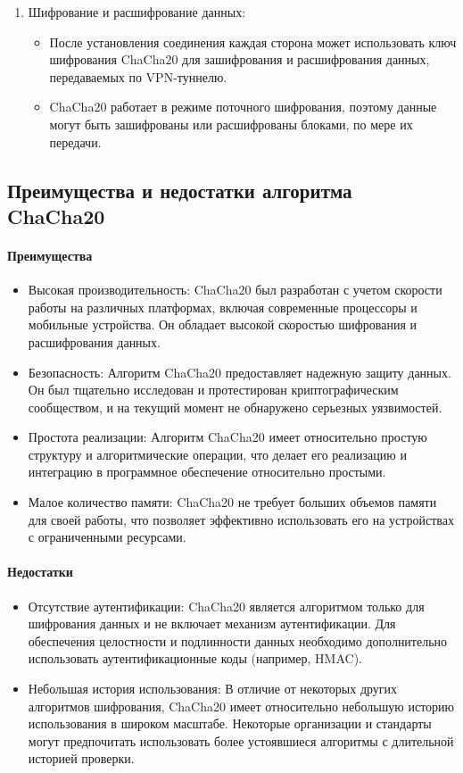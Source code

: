 \documentclass[12pt]{article}
\begin{document}
\begin{enumerate}
        \item Шифрование и расшифрование данных:
        \begin{itemize}
            \item После установления соединения каждая сторона может использовать ключ шифрования ChaCha20 для зашифрования и расшифрования данных, передаваемых по VPN-туннелю.
            \item ChaCha20 работает в режиме поточного шифрования, поэтому данные могут быть зашифрованы или расшифрованы блоками, по мере их передачи.
        \end{itemize}
    \end{enumerate}

    \subsection{Преимущества и недостатки алгоритма ChaCha20}

    \paragraph{Преимущества}
    \begin{itemize}
        \item Высокая производительность: ChaCha20 был разработан с учетом скорости работы на различных платформах, включая современные процессоры и мобильные устройства.
        Он обладает высокой скоростью шифрования и расшифрования данных.
        \item Безопасность: Алгоритм ChaCha20 предоставляет надежную защиту данных.
        Он был тщательно исследован и протестирован криптографическим сообществом, и на текущий момент не обнаружено серьезных уязвимостей.
        \item Простота реализации: Алгоритм ChaCha20 имеет относительно простую структуру и алгоритмические операции, что делает его реализацию и интеграцию в программное обеспечение относительно простыми.
        \item Малое количество памяти: ChaCha20 не требует больших объемов памяти для своей работы, что позволяет эффективно использовать его на устройствах с ограниченными ресурсами.
    \end{itemize}

    \paragraph{Недостатки}
    \begin{itemize}
        \item Отсутствие аутентификации: ChaCha20 является алгоритмом только для шифрования данных и не включает механизм аутентификации.
        Для обеспечения целостности и подлинности данных необходимо дополнительно использовать аутентификационные коды (например, HMAC).
        \item Небольшая история использования: В отличие от некоторых других алгоритмов шифрования, ChaCha20 имеет относительно небольшую историю использования в широком масштабе.
        Некоторые организации и стандарты могут предпочитать использовать более устоявшиеся алгоритмы с длительной историей проверки.
    \end{itemize}
\end{document}
